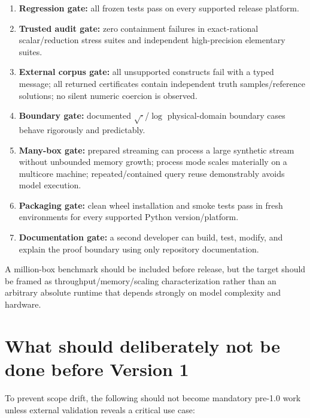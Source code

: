 \documentclass[11pt]{article}
\begin{document}
\begin{enumerate}[leftmargin=*]
\item \textbf{Regression gate:} all frozen tests pass on every supported release
platform.
\item \textbf{Trusted audit gate:} zero containment failures in exact-rational
scalar/reduction stress suites and independent high-precision elementary suites.
\item \textbf{External corpus gate:} all unsupported constructs fail with a typed
message; all returned certificates contain independent truth samples/reference
solutions; no silent numeric coercion is observed.
\item \textbf{Boundary gate:} documented \(\sqrt{\cdot}\)/\(\log\) physical-domain
boundary cases behave rigorously and predictably.
\item \textbf{Many-box gate:} prepared streaming can process a large synthetic
stream without unbounded memory growth; process mode scales materially on a
multicore machine; repeated/contained query reuse demonstrably avoids model
execution.
\item \textbf{Packaging gate:} clean wheel installation and smoke tests pass in
fresh environments for every supported Python version/platform.
\item \textbf{Documentation gate:} a second developer can build, test, modify,
and explain the proof boundary using only repository documentation.
\end{enumerate}

A million-box benchmark should be included before release, but the target should
be framed as throughput/memory/scaling characterization rather than an arbitrary
absolute runtime that depends strongly on model complexity and hardware.

\section{What should deliberately not be done before Version 1}

To prevent scope drift, the following should not become mandatory pre-1.0 work
unless external validation reveals a critical use case:
\end{document}
